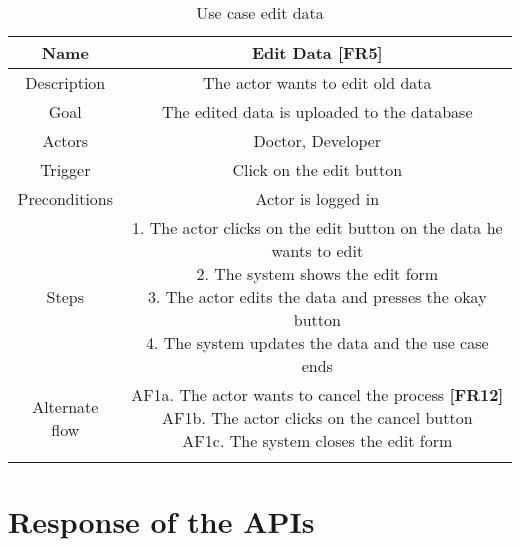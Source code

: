 \begin{table}[H]
	\begin{center}\scriptsize
		\begin{tabular}{ c|c }
			\hline
			Name & Edit Data \textbf{[FR5]} \\ 
			\hline	
			Description & The actor wants to edit old data \\ 
			\hline
			Goal & The edited data is uploaded to the database \\ 
			\hline
			Actors & Doctor, Developer \\ 
			\hline
			Trigger & Click on the edit button \\ 
			\hline
			Preconditions & Actor is logged in \\ 
			\hline
			Steps & \parbox{9cm}{\vspace{.5\baselineskip}
				1. The actor clicks on the edit button on the data he wants to edit\\
				2. The system shows the edit form\\
				3. The actor edits the data and presses the okay button\\
				4. The system updates the data and the use case ends
			}\\
			\hline
			Alternate flow & \parbox{9cm}{\vspace{.5\baselineskip}
				AF1a. The actor wants to cancel the process \textbf{[FR12]}\\
				AF1b. The actor clicks on the cancel button\\
				AF1c. The system closes the edit form}\\ \\ 
			\hline
		\end{tabular}
	\end{center}\normalsize
	\caption{Use case edit data}
\end{table}

\newpage
\scriptsize
\chapter{Response of the APIs}

